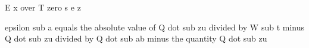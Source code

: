 E x over T zero s e z

epsilon sub a equals the absolute value of Q dot sub zu divided by W sub t minus Q dot sub zu divided by Q dot sub ab minus the quantity Q dot sub zu